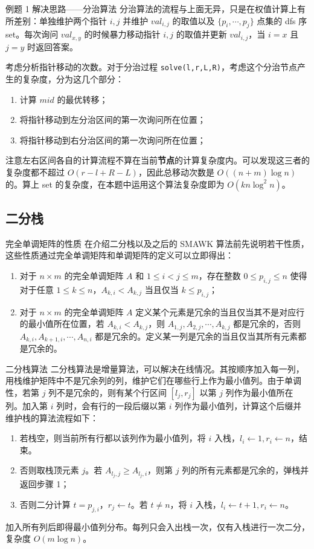 \documentclass{beamer}
\begin{document}
\begin{frame}{例题 1 解决思路——分治算法}
分治算法的流程与上面无异，只是在权值计算上有所差别：单独维护两个指针 $i,j$ 并维护 $val_{i,j}$ 的取值以及 $\{p_i,\cdots,p_j\}$ 点集的 dfs 序 set。每次询问 $val_{x,y}$ 的时候暴力移动指针 $i,j$ 的取值并更新 $val_{i,j}$，当 $i=x$ 且 $j=y$ 时返回答案。\pause

考虑分析指针移动的次数。对于分治过程 \texttt{solve(l,r,L,R)}，考虑这个分治节点产生的复杂度，分为这几个部分：
\begin{enumerate}
\item 计算 $mid$ 的最优转移；
\item 将指针移动到左分治区间的第一次询问所在位置；
\item 将指针移动到右分治区间的第一次询问所在位置；
\end{enumerate}
注意左右区间各自的计算流程不算在当前\textbf{节点}的计算复杂度内。可以发现这三者的复杂度都不超过 $O(r-l+R-L)$，因此总移动次数是 $O((n+m)\log n)$ 的。算上 set 的复杂度，在本题中运用这个算法复杂度即为 $O(kn\log^2 n)$。
\end{frame}
\subsection{二分栈}
\begin{frame}{完全单调矩阵的性质}
	在介绍二分栈以及之后的 SMAWK 算法前先说明若干性质，这些性质通过完全单调矩阵和单调矩阵的定义可以立即得出：
	\begin{enumerate}
		\item 对于 $n \times m$ 的完全单调矩阵 $A$ 和 $1 \leq i < j \leq m$，存在整数 $0 \leq p_{i,j} \leq n$ 使得对于任意 $1 \leq k \leq n$，$A_{k,i} < A_{k,j}$ 当且仅当 $k \leq p_{i,j}$；
		\item 对于 $n \times m$ 的完全单调矩阵 $A$ 定义某个元素是冗余的当且仅当其不是对应行的最小值所在位置，若 $A_{k,i} < A_{k,j}$，则 $A_{1,j},A_{2,j},\cdots,A_{k,j}$ 都是冗余的，否则 $A_{k,i},A_{k+1,i},\cdots,A_{n,i}$ 都是冗余的。定义某一列是冗余的当且仅当其所有元素都是冗余的。
	\end{enumerate}
\end{frame}
\begin{frame}{二分栈算法}
	二分栈算法是增量算法，可以解决在线情况。其按顺序加入每一列，用栈维护矩阵中不是冗余列的列，维护它们在哪些行上作为最小值列。由于单调性，若第 $j$ 列不是冗余的，则有某个行区间 $[l_j,r_j]$ 以第 $j$ 列作为最小值所在列。加入第 $i$ 列时，会有行的一段后缀以第 $i$ 列作为最小值列，计算这个后缀并维护栈的算法流程如下：
	\begin{enumerate}
		\item 若栈空，则当前所有行都以该列作为最小值列，将 $i$ 入栈，$l_i \leftarrow 1, r_i \leftarrow n$，结束。
		\item 否则取栈顶元素 $j$。若 $A_{l_j,j} \geq A_{l_j,i}$，则第 $j$ 列的所有元素都是冗余的，弹栈并返回步骤 1；
		\item 否则二分计算 $t = p_{j,i}$，$r_j \leftarrow t$。若 $t \neq n$，将 $i$ 入栈，$l_i \leftarrow t + 1,r_i \leftarrow n$。
	\end{enumerate}
	加入所有列后即得最小值列分布。每列只会入出栈一次，仅有入栈进行一次二分，复杂度 $O(m \log n)$。
\end{frame}
\end{document}
